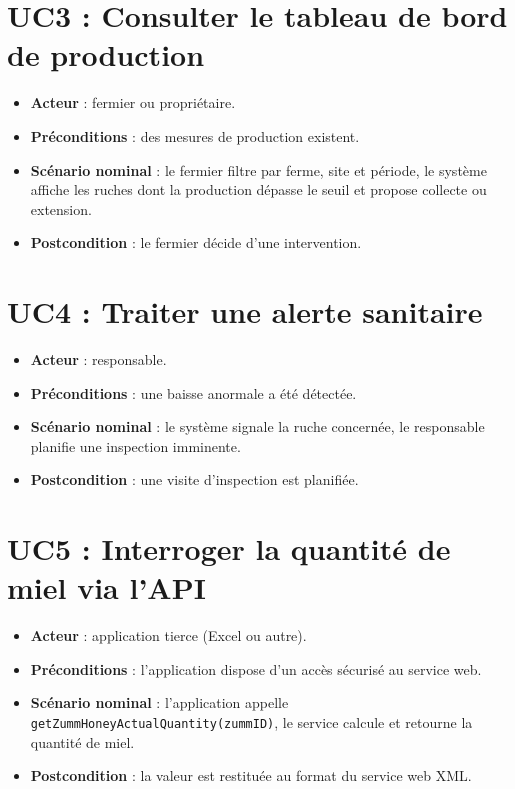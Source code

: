 \section{UC3 : Consulter le tableau de bord de production}
\begin{itemize}
  \item \textbf{Acteur} : fermier ou propriétaire.
  \item \textbf{Préconditions} : des mesures de production existent.
  \item \textbf{Scénario nominal} : le fermier filtre par ferme, site et période, le système affiche les ruches dont la production dépasse le seuil et propose collecte ou extension.
  \item \textbf{Postcondition} : le fermier décide d'une intervention.
\end{itemize}

\section{UC4 : Traiter une alerte sanitaire}
\begin{itemize}
  \item \textbf{Acteur} : responsable.
  \item \textbf{Préconditions} : une baisse anormale a été détectée.
  \item \textbf{Scénario nominal} : le système signale la ruche concernée, le responsable planifie une inspection imminente.
  \item \textbf{Postcondition} : une visite d'inspection est planifiée.
\end{itemize}

\section{UC5 : Interroger la quantité de miel via l'API}
\begin{itemize}
  \item \textbf{Acteur} : application tierce (Excel ou autre).
  \item \textbf{Préconditions} : l'application dispose d'un accès sécurisé au service web.
  \item \textbf{Scénario nominal} : l'application appelle \texttt{getZummHoneyActualQuantity(zummID)}, le service calcule et retourne la quantité de miel.
  \item \textbf{Postcondition} : la valeur est restituée au format du service web XML.
\end{itemize}

